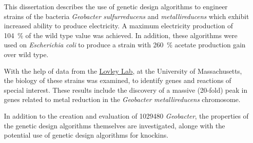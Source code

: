 This dissertation describes the use of genetic design algorithms to engineer strains of the bacteria \textit{Geobacter sulfurreducens} and \textit{metallireducens} which exhibit increased ability to produce electricity. 
A maximum electricity production of \SI{104}{\percent} of the wild type value was achieved.
In addition, these algorithms were used on \textit{Escherichia coli} to produce a strain with \SI{260}{\percent} acetate production gain over wild type.

With the help of data from the \href{http://www.geobacter.org/}{Lovley Lab}, at the University of Massachusetts, the biology of these strains was examined, to identify genes and reactions of special interest. These results include the discovery of a massive (20-fold) peak in genes related to metal reduction in the \textit{Geobacter metallireducens} chromosome.

In addition to the creation and evaluation of \num{1029480} \textit{Geobacter}, the properties of the genetic design algorithms themselves are investigated, alonge with the potential use of genetic design algorithms for knockins.